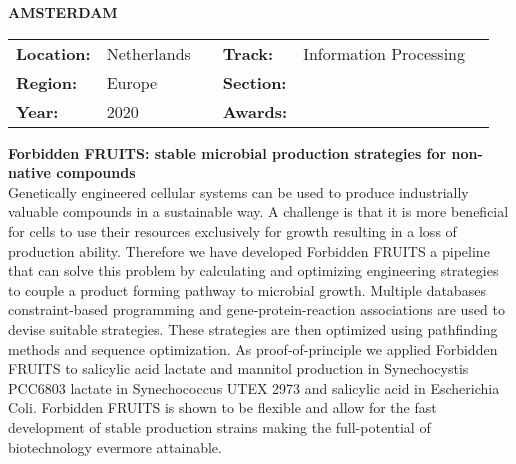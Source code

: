 \textbf{\uppercase{Amsterdam}} \FloatBarrier \begin{table}[h] \begin{tabular}{lp{2.5cm}llll} \textbf{Location:} & Netherlands & \multicolumn{1}{|l}{} & \textbf{Track:}   & Information Processing \\ \textbf{Region:}   & Europe   & \multicolumn{1}{|l}{} & \textbf{Section:} &  \\ \textbf{Year:}     & 2020   & \multicolumn{1}{|l}{} & \textbf{Awards:}  & \end{tabular} \end{table} \FloatBarrier \noindent\textbf{Forbidden FRUITS: stable microbial production strategies for non-native compounds} \vspace{.2cm}\\ 
Genetically engineered cellular systems can be used to produce industrially valuable compounds in a sustainable way. A challenge is that it is more beneficial for cells to use their resources exclusively for growth resulting in a loss of production ability. Therefore we have developed Forbidden FRUITS a pipeline that can solve this problem by calculating and optimizing engineering strategies to couple a product forming pathway to microbial growth. Multiple databases constraint-based programming and gene-protein-reaction associations are used to devise suitable strategies. These strategies are then optimized using pathfinding methods and sequence optimization. As proof-of-principle we applied Forbidden FRUITS to salicylic acid lactate and mannitol production in Synechocystis PCC6803 lactate in Synechococcus UTEX 2973 and salicylic acid in Escherichia Coli. Forbidden FRUITS is shown to be flexible and allow for the fast development of stable production strains making the full-potential of biotechnology evermore attainable.
\vspace{2cm} $ $
\pagebreak

